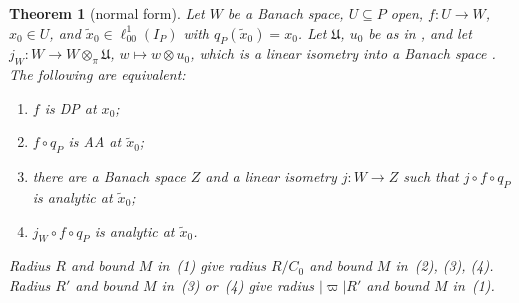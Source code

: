 \documentclass[11pt]{amsart}
\newtheorem{theorem}{Theorem}[section]
\theoremstyle{definition}
\theoremstyle{remark}
\numberwithin{equation}{section}
\newcommand{\abs}[1]{\lvert #1\rvert}
\theoremstyle{plain}
\theoremstyle{definition}
\theoremstyle{plain}
\newcommand{\hot}{\mathbin{\widehat\otimes}}
\begin{document}
\begin{theorem}[normal form]\label{dp:thm:normal-form}
Let $W$ be a Banach space, $U\subseteq P$ open, $f\colon U\to W$, $x_0\in U$, and $\tilde x_0\in\ell^1_{00}(I_P)$ with $q_P(\tilde x_0)=x_0$. Let $\mathfrak U$, $u_0$ be as in \cite[(14.8)]{I}, and let $j_W\colon W\to W\hot_\pi\mathfrak U$, $w\mapsto w\otimes u_0$, which is a linear isometry into a Banach space \cite[Remark~14.41]{I}. The following are equivalent:
\begin{enumerate}
\item $f$ is DP at $x_0$;
\item $f\circ q_P$ is AA at $\tilde x_0$;
\item there are a Banach space $Z$ and a linear isometry $j\colon W\to Z$ such that $j\circ f\circ q_P$ is analytic at $\tilde x_0$;
\item $j_W\circ f\circ q_P$ is analytic at $\tilde x_0$.
\end{enumerate}
Radius $R$ and bound $M$ in~(1) give radius $R/C_0$ and bound $M$ in~(2), (3), (4). Radius $R'$ and bound $M$ in~(3) or~(4) give radius $\abs\varpi R'$ and bound $M$ in~(1).
\end{theorem}
\end{document}
